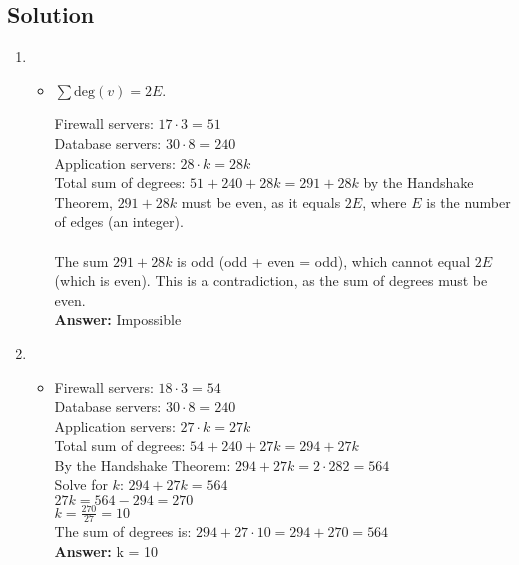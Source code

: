 \documentclass[11pt]{article}
\begin{document}
    \subsection*{Solution}
    \begin{enumerate}[label=(\alph*)]
        \item
        \begin{itemize}
            \item[] %
\(\sum \text{deg}(v) = 2E\).

Firewall servers: \( 17 \cdot 3 = 51 \) \\
Database servers: \( 30 \cdot 8 = 240 \) \\
Application servers: \( 28 \cdot k = 28k \) \\

Total sum of degrees:
\(
51 + 240 + 28k = 291 + 28k
\)
by the Handshake Theorem, \(291 + 28k\) must be even, as it equals \( 2E \), where \( E \) is the number of edges (an integer). \\ \\
The sum \( 291 + 28k \) is odd (odd + even = odd), which cannot equal \( 2E \) (which is even). This is a contradiction, as the sum of degrees must be even. \\
\textbf{Answer:} Impossible
        \end{itemize}
        \item
        \begin{itemize}
            \item[]


Firewall servers: \( 18 \cdot 3 = 54 \) \\
Database servers: \( 30 \cdot 8 = 240 \) \\
Application servers: \( 27 \cdot k = 27k \) \\

Total sum of degrees:
\(
54 + 240 + 27k = 294 + 27k
\) \\
By the Handshake Theorem:
\(
294 + 27k = 2 \cdot 282 = 564
\) \\
Solve for \( k \):
\(
294 + 27k = 564
\) \\
\(
27k = 564 - 294 = 270
\) \\
\(
k = \frac{270}{27} = 10
\) \\
The sum of degrees is:
\(
294 + 27 \cdot 10 = 294 + 270 = 564
\) \\
\textbf{Answer:} k = 10
        \end{itemize}
    \end{enumerate}
\end{document}
